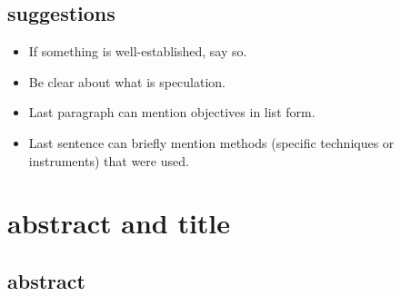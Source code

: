 \documentclass[
]{krantz}
\providecommand{\tightlist}{%
  \setlength{\itemsep}{0pt}\setlength{\parskip}{0pt}}
\begin{document}
\hypertarget{suggestions-1}{%
\subsection{suggestions}\label{suggestions-1}}

\begin{itemize}
\tightlist
\item
  If something is well-established, say so.
\item
  Be clear about what is speculation.
\item
  Last paragraph can mention objectives in list form.
\item
  Last sentence can briefly mention methods (specific techniques or instruments) that were used.
\end{itemize}

\hypertarget{abstract-and-title}{%
\section{abstract and title}\label{abstract-and-title}}

\hypertarget{abstract}{%
\subsection{abstract}\label{abstract}}
\end{document}
